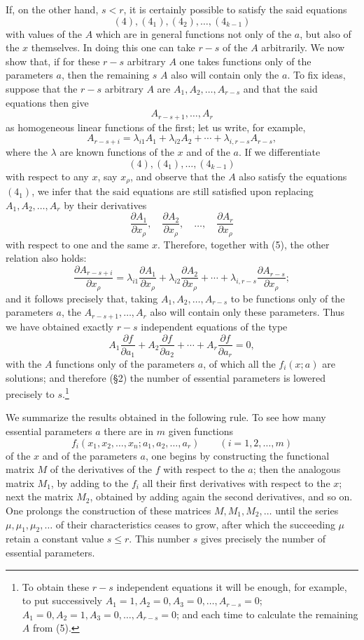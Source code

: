 \documentclass[11pt]{book}
\begin{document}
If, on the other hand, $s<r$, it is certainly possible to satisfy the said equations
\[
 (4),(4_1),(4_2),\ldots,(4_{k-1})
\]
with values of the $A$ which are in general functions not only of the $a$, but also of the $x$ themselves. In doing this one can take $r-s$ of the $A$ arbitrarily. We now show that, if for these $r-s$ arbitrary $A$ one takes functions only of the parameters $a$, then the remaining $s$ $A$ also will contain only the $a$. To fix ideas, suppose that the $r-s$ arbitrary $A$ are $A_1,A_2,\ldots,A_{r-s}$ and that the said equations then give
\[
 A_{r-s+1},\ldots,A_r
\]
as homogeneous linear functions of the first; let us write, for example,
\begin{equation*}\tag{5}
 A_{r-s+i}=\lambda_{i1}A_1+\lambda_{i2}A_2+\cdots+\lambda_{i,r-s}A_{r-s},
\end{equation*}
where the $\lambda$ are known functions of the $x$ and of the $a$. If we differentiate
\[
 (4),(4_1),\ldots,(4_{k-1})
\]
with respect to any $x$, say $x_\rho$, and observe that the $A$ also satisfy the equations $(4_1)$, we infer that the said equations are still satisfied upon replacing $A_1,A_2,\ldots,A_r$ by their derivatives
\[
 \frac{\partial A_1}{\partial x_\rho},\quad
 \frac{\partial A_2}{\partial x_\rho},\quad\ldots,\quad
 \frac{\partial A_r}{\partial x_\rho}
\]
with respect to one and the same $x$. Therefore, together with (5), the other relation also holds:
\[
 \frac{\partial A_{r-s+i}}{\partial x_\rho}=\lambda_{i1}\frac{\partial A_1}{\partial x_\rho}+\lambda_{i2}\frac{\partial A_2}{\partial x_\rho}+\cdots+\lambda_{i,r-s}\frac{\partial A_{r-s}}{\partial x_\rho};
\]
and it follows precisely that, taking $A_1,A_2,\ldots,A_{r-s}$ to be functions only of the parameters $a$, the $A_{r-s+1},\ldots,A_r$ also will contain only these parameters. Thus we have obtained exactly $r-s$ independent equations of the type
\[
 A_1\frac{\partial f}{\partial a_1}+A_2\frac{\partial f}{\partial a_2}+\cdots+A_r\frac{\partial f}{\partial a_r}=0,\tag{*}
\]
with the $A$ functions only of the parameters $a$, of which all the $f_i(x;a)$ are solutions; and therefore (\S{}2) the number of essential parameters is lowered precisely to $s$.\footnote{To obtain these $r-s$ independent equations it will be enough, for example, to put successively $A_1=1,A_2=0,A_3=0,\ldots,A_{r-s}=0$; $A_1=0,A_2=1,A_3=0,\ldots,A_{r-s}=0$; and each time to calculate the remaining $A$ from (5).}

We summarize the results obtained in the following rule. To see how many essential parameters $a$ there are in $m$ given functions
\[
 f_i(x_1,x_2,\ldots,x_n;a_1,a_2,\ldots,a_r)\qquad (i=1,2,\ldots,m)
\]
of the $x$ and of the parameters $a$, one begins by constructing the functional matrix $M$ of the derivatives of the $f$ with respect to the $a$; then the analogous matrix $M_1$, by adding to the $f_i$ all their first derivatives with respect to the $x$; next the matrix $M_2$, obtained by adding again the second derivatives, and so on. One prolongs the construction of these matrices $M,M_1,M_2,\ldots$ until the series $\mu,\mu_1,\mu_2,\ldots$ of their characteristics ceases to grow, after which the succeeding $\mu$ retain a constant value $s\le r$. This number $s$ gives precisely the number of essential parameters.
\end{document}
